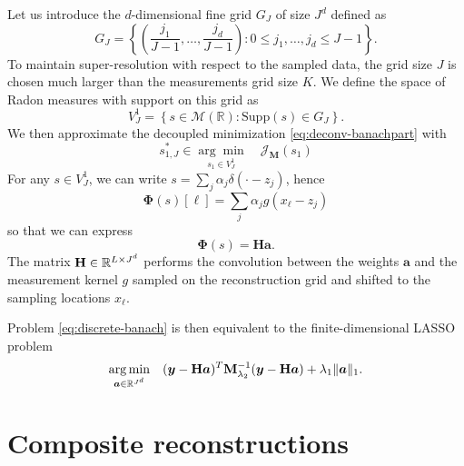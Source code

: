         Let us introduce the $d$-dimensional fine grid $G_J$ of size $J^d$ defined as
        \begin{equation*}
            G_J = \left\{ \left(\frac{j_1}{J-1}, \dots, \frac{j_d}{J-1} \right) : 0 \leq  j_1, \dots, j_d \leq J-1 \right\}.
        \end{equation*}
        To maintain super-resolution with respect to the sampled data, the grid size $J$ is chosen much larger than the measurements grid size $K$. We define the space of Radon measures with support on this grid as
        \begin{equation*}
            V^1_J = \left\{ s \in \mathcal{M}(\mathbb{R}) : \mathrm{Supp}(s) \in G_J \right\}.
        \end{equation*}
        We then approximate the decoupled minimization \eqref{eq:deconv-banachpart} with
        \begin{equation}
            \label{eq:discrete-banach}
            s_{1, J}^* \in \underset{ s_1\in V^1_J}{\arg\min} \quad \mathcal{J}_\mathbf{M}(s_1)
        \end{equation}
        For any $s \in V^1_J$, we can write $s = \sum_j \alpha_j \delta (\cdot - z_j) $, hence
        $$
        \bm{\Phi}(s)[\ell] = \sum_j \alpha_j g(x_{\ell} - z_j)
        $$
        so that we can express 
        $$
        \bm{\Phi}(s) = \mathbf{H}\bm{a}.
        $$
        The matrix $\mathbf{H} \in \mathbb{R}^{L \times J^d}$ performs the convolution between the weights $\bm{a}$ and the measurement kernel $g$ sampled on the reconstruction grid and shifted to the sampling locations $x_{\ell}$. 
        
        
        Problem \eqref{eq:discrete-banach} is then equivalent to the finite-dimensional LASSO problem
        \begin{equation*}
            \underset{ \bm{a} \in \mathbb{R}^{J^d}}{\arg\min} \quad ( \bm{y} - \mathbf{H}\bm{a}  )^T \mathbf{M}_{\lambda_{2}}^{-1} ( \bm{y} - \mathbf{H}\bm{a}  )  + \lambda_{1} \| \bm{a} \|_{1}.
        \end{equation*}    

\clearpage
\section{Composite reconstructions}
    \label{app:reconstructions}

    \vfill

